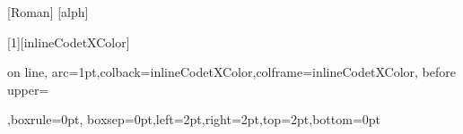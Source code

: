 \usepackage[para]{manyfoot}
[Roman]
[alph]

\usepackage[multiple]{footmisc}



\usepackage{url}

\usepackage{tikz-uml}

\usepackage{blindtext}


\usepackage{tcolorbox}


\newtcbox{\inlineCodetcbox}[1][inlineCodetXColor]{on line,
arc=1pt,colback=inlineCodetXColor,colframe=inlineCodetXColor,
before upper={\rule[-3pt]{0pt}{10pt}},boxrule=0pt,
boxsep=0pt,left=2pt,right=2pt,top=2pt,bottom=0pt} 



\newcommand{\alexlistingcaption}[3]{\caption[#1 #2]{#2, Quelle: Eigenes Listing, Datei: \url{#3}}}


\renewcommand{\listingscaption}{Listing}
\newenvironment{alexlisting}[4]
{%
  \ifincludeall
  
    \begin{listing}[ht]%
      \begin{codeFrame}
      \inputminted[#4]{dart}{#3}%
      \end{codeFrame}

      \alexlistingcaption{#1}{#2}{#3}%
      \fi
      }%
      {%
      \ifincludeall

    \end{listing}%
  \fi
}



